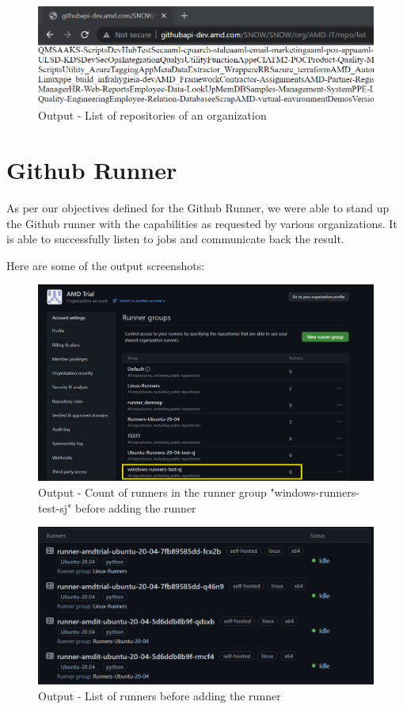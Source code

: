 \begin{figure}[H]
\centering
\includegraphics[width = .8\textwidth]{Images/LISTREPOS}
\caption{Output - List of repositories of an organization}
\label{List of repositories in an organization}
\end{figure}


\section{Github Runner}
As per our objectives defined for the Github Runner, we were able to stand up the Github runner with the capabilities as requested by various organizations. It is able to successfully listen to jobs and communicate back the result.

Here are some of the output screenshots:

\begin{figure}[H]
\centering
\includegraphics[width = 1\linewidth]{Images/RUNNER1}
\caption{Output - Count of runners in the runner group "windows-runners-test-sj" before adding the runner}
\label{Count of runners in the runner group "windows-runners-test-sj" before adding the runner}
\end{figure}

\begin{figure}[H]
\centering
\includegraphics[width = 1\linewidth]{Images/RUNNER4}
\caption{Output - List of runners before adding the runner}
\label{List of runners before adding the runner}
\end{figure}

